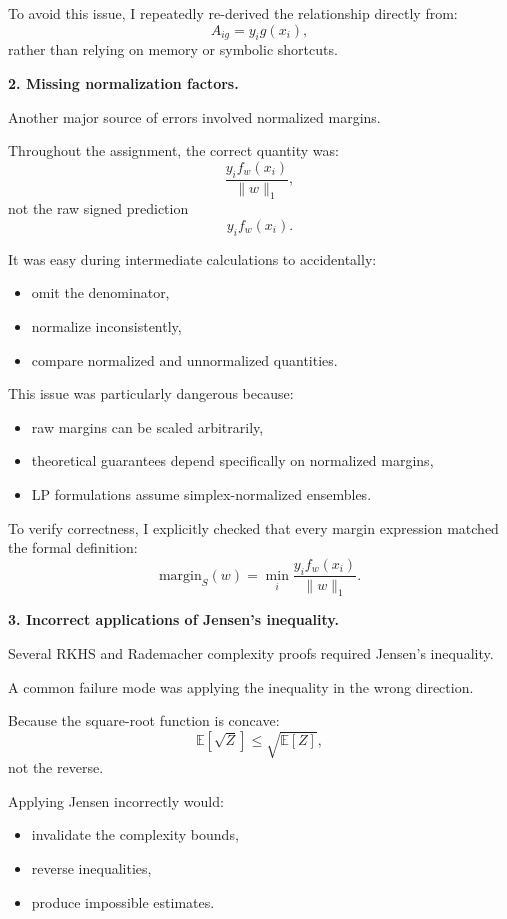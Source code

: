 \documentclass[11pt]{article}
\newcommand{\E}{\mathbb{E}}
\begin{document}
\begin{enumerate}
\begin{solutionbox}
To avoid this issue, I repeatedly re-derived the relationship directly from:
\[
A_{ig}=y_ig(x_i),
\]
rather than relying on memory or symbolic shortcuts.

\medskip

\textbf{2. Missing normalization factors.}

Another major source of errors involved normalized margins.

Throughout the assignment, the correct quantity was:
\[
\frac{
y_if_w(x_i)
}{
\|w\|_1
},
\]
not the raw signed prediction
\[
y_if_w(x_i).
\]

It was easy during intermediate calculations to accidentally:
\begin{itemize}
    \item omit the denominator,
    \item normalize inconsistently,
    \item compare normalized and unnormalized quantities.
\end{itemize}

This issue was particularly dangerous because:
\begin{itemize}
    \item raw margins can be scaled arbitrarily,
    \item theoretical guarantees depend specifically on normalized margins,
    \item LP formulations assume simplex-normalized ensembles.
\end{itemize}

To verify correctness, I explicitly checked that every margin expression matched the formal definition:
\[
\mathrm{margin}_S(w)
=
\min_i
\frac{
y_if_w(x_i)
}{
\|w\|_1
}.
\]

\medskip

\textbf{3. Incorrect applications of Jensen's inequality.}

Several RKHS and Rademacher complexity proofs required Jensen's inequality.

A common failure mode was applying the inequality in the wrong direction.

Because the square-root function is concave:
\[
\E[\sqrt Z]
\le
\sqrt{\E[Z]},
\]
not the reverse.

Applying Jensen incorrectly would:
\begin{itemize}
    \item invalidate the complexity bounds,
    \item reverse inequalities,
    \item produce impossible estimates.
\end{itemize}


\end{solutionbox}
\end{enumerate}
\end{document}
